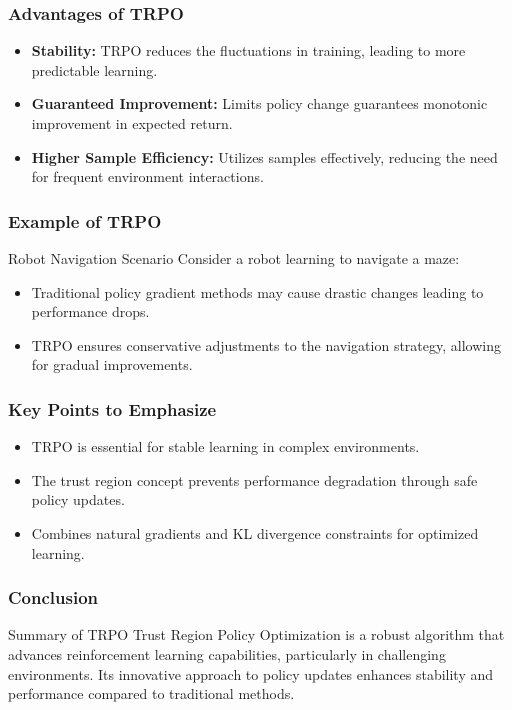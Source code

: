 \documentclass{beamer}
\begin{document}
\begin{frame}[fragile]
    \frametitle{Advantages of TRPO}
    \begin{itemize}
        \item \textbf{Stability:} TRPO reduces the fluctuations in training, leading to more predictable learning.
        \item \textbf{Guaranteed Improvement:} Limits policy change guarantees monotonic improvement in expected return.
        \item \textbf{Higher Sample Efficiency:} Utilizes samples effectively, reducing the need for frequent environment interactions.
    \end{itemize}
\end{frame}

\begin{frame}[fragile]
    \frametitle{Example of TRPO}
    \begin{block}{Robot Navigation Scenario}
        Consider a robot learning to navigate a maze:
        \begin{itemize}
            \item Traditional policy gradient methods may cause drastic changes leading to performance drops.
            \item TRPO ensures conservative adjustments to the navigation strategy, allowing for gradual improvements.
        \end{itemize}
    \end{block}
\end{frame}

\begin{frame}[fragile]
    \frametitle{Key Points to Emphasize}
    \begin{itemize}
        \item TRPO is essential for stable learning in complex environments.
        \item The trust region concept prevents performance degradation through safe policy updates.
        \item Combines natural gradients and KL divergence constraints for optimized learning.
    \end{itemize}
\end{frame}

\begin{frame}[fragile]
    \frametitle{Conclusion}
    \begin{block}{Summary of TRPO}
        Trust Region Policy Optimization is a robust algorithm that advances reinforcement learning capabilities,
        particularly in challenging environments. Its innovative approach to policy updates enhances stability
        and performance compared to traditional methods.
    \end{block}
\end{frame}
\end{document}
